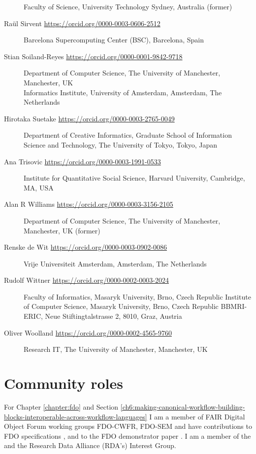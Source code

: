 \begin{flushleft}
\begin{description}
Faculty of Science, University Technology Sydney, Australia (former)
\item[Raül Sirvent \url{https://orcid.org/0000-0003-0606-2512}]
Barcelona Supercomputing Center (BSC), Barcelona, Spain
\item[Stian Soiland-Reyes \url{https://orcid.org/0000-0001-9842-9718}]
Department of Computer Science, The University of Manchester,
Manchester, UK\\
Informatics Institute, University of Amsterdam, Amsterdam, The
Netherlands
\item[Hirotaka Suetake \url{https://orcid.org/0000-0003-2765-0049}]
Department of Creative Informatics, Graduate School of Information Science and Technology, The University of Tokyo, Tokyo, Japan
\item[Ana Trisovic \url{https://orcid.org/0000-0003-1991-0533}]
Institute for Quantitative Social Science, Harvard University,
Cambridge, MA, USA
\item[Alan R Williams \url{https://orcid.org/0000-0003-3156-2105}] 
Department of Computer Science, The University of Manchester,
Manchester, UK (former)
\item[Renske de Wit \url{https://orcid.org/0000-0003-0902-0086}]
Vrije Universiteit Amsterdam, Amsterdam, The Netherlands

\item[Rudolf Wittner \url{https://orcid.org/0000-0002-0003-2024}]
Faculty of Informatics, Masaryk University, Brno, Czech Republic
Institute of Computer Science, Masaryk University, Brno, Czech Republic
BBMRI-ERIC, Neue Stiftingtalstrasse 2, 8010, Graz, Austria
\item[Oliver Woolland \url{https://orcid.org/0000-0002-4565-9760}]
Research IT, The University of Manchester, Manchester, UK


\end{description}\end{flushleft}


\section{Community roles}

For Chapter \ref{chapter:fdo} and Section \ref{ch6:making-canonical-workflow-building-blocks-interoperable-across-workflow-languages} I am a member of FAIR Digital Object Forum \cite{FAIRDigitalObjects} working groups FDO-CWFR, FDO-SEM and have contributions to FDO specifications \cite{Anders 2023,Ivonne 2023}, and to the FDO demonstrator paper \cite{Wittenburg 2022a}. I am a member of the  and the Research Data Alliance (RDA's)  Interest Group.

